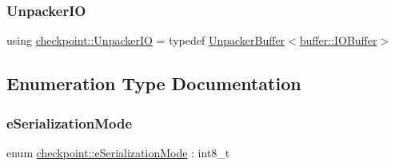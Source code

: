 \subsubsection{\texorpdfstring{Unpacker\+IO}{UnpackerIO}}
{\footnotesize\ttfamily using \hyperlink{namespacecheckpoint_a0efc06d99dce79e452b9d1b503059a74}{checkpoint\+::\+Unpacker\+IO} = typedef \hyperlink{structcheckpoint_1_1_unpacker_buffer}{Unpacker\+Buffer}$<$\hyperlink{structcheckpoint_1_1buffer_1_1_i_o_buffer}{buffer\+::\+I\+O\+Buffer}$>$}



\subsection{Enumeration Type Documentation}
\mbox{\label{namespacecheckpoint_ae2509499ccd8b1dc48fb535bf8aa3059}} 
\subsubsection{\texorpdfstring{e\+Serialization\+Mode}{eSerializationMode}}
{\footnotesize\ttfamily enum \hyperlink{namespacecheckpoint_ae2509499ccd8b1dc48fb535bf8aa3059}{checkpoint\+::e\+Serialization\+Mode} \+: int8\+\_\+t\hspace{0.3cm}{\ttfamily [strong]}}

